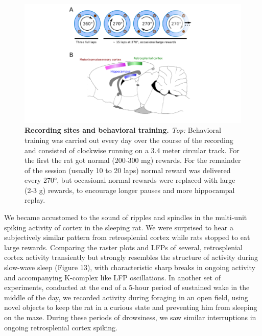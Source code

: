 \documentclass[]{article}
\begin{document}
\begin{figure}[htbp]
\centering
\includegraphics{./finalFigs/SWW/expDesign.png}
\caption{\textbf{Recording sites and behavioral training.} \emph{Top:}
Behavioral training was carried out every day over the course of the
recording and consisted of clockwise running on a 3.4 meter circular
track. For the first the rat got normal (200-300 mg) rewards. For the
remainder of the session (usually 10 to 20 laps) normal reward was
delivered every 270°, but occasional normal rewards were replaced with
large (2-3 g) rewards, to encourage longer pauses and more hippocampal
replay.}
\end{figure}

We became accustomed to the sound of ripples and spindles in the
multi-unit spiking activity of cortex in the sleeping rat. We were
surprised to hear a subjectively similar pattern from retrosplenial
cortex while rats stopped to eat large rewards. Comparing the raster
plots and LFPs of several, retrosplenial cortex activity transiently but
strongly resembles the structure of activity during slow-wave sleep
(Figure 13), with characteristic sharp breaks in ongoing activity and
accompanying K-complex like LFP oscillations. In another set of
experiments, conducted at the end of a 5-hour period of sustained wake
in the middle of the day, we recorded activity during foraging in an
open field, using novel objects to keep the rat in a curious state and
preventing him from sleeping on the maze. During these periods of
drowsiness, we saw similar interruptions in ongoing retrosplenial cortex
spiking.
\end{document}
